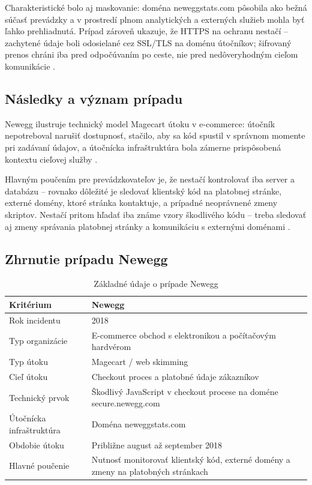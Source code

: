 Charakteristické bolo aj maskovanie: doména neweggstats.com pôsobila ako bežná súčasť prevádzky a v prostredí plnom analytických a externých služieb mohla byť ľahko prehliadnutá. Prípad zároveň ukazuje, že HTTPS na ochranu nestačí -- zachytené údaje boli odosielané cez SSL/TLS na doménu útočníkov; šifrovaný prenos chráni iba pred odpočúvaním po ceste, nie pred nedôveryhodným cieľom komunikácie \cite{owaspSRI,pciSsc2025PaymentPage,volexity2018Newegg}.

\subsection{Následky a význam prípadu}

Newegg ilustruje technický model Magecart útoku v e-commerce: útočník nepotreboval narušiť dostupnosť, stačilo, aby sa kód spustil v správnom momente pri zadávaní údajov, a útočnícka infraštruktúra bola zámerne prispôsobená kontextu cieľovej služby \cite{volexity2018Newegg,fortinet2019MagecartSkimmer}.

Hlavným poučením pre prevádzkovateľov je, že nestačí kontrolovať iba server a databázu -- rovnako dôležité je sledovať klientský kód na platobnej stránke, externé domény, ktoré stránka kontaktuje, a prípadné neoprávnené zmeny skriptov. Nestačí pritom hľadať iba známe vzory škodlivého kódu -- treba sledovať aj zmeny správania platobnej stránky a komunikáciu s externými doménami \cite{pciSsc2025PaymentPage}.

\subsection{Zhrnutie prípadu Newegg}

\begin{table}[htbp]
    \centering
    \caption{Základné údaje o prípade Newegg}
    \label{tab:newegg-summary}
    \begin{tabularx}{\textwidth}{@{}p{}X@{}}
        \toprule
        \textbf{Kritérium} & \textbf{Newegg} \\
        \midrule
        Rok incidentu & 2018 \\
        Typ organizácie & E-commerce obchod s elektronikou a počítačovým hardvérom \\
        Typ útoku & Magecart / web skimming \\
        Cieľ útoku & Checkout proces a platobné údaje zákazníkov \\
        Technický prvok & Škodlivý JavaScript v checkout procese na doméne \mbox{secure.newegg.com} \\
        Útočnícka infraštruktúra & Doména neweggstats.com \\
        Obdobie útoku & Približne august až september 2018 \\
        Hlavné poučenie & Nutnosť monitorovať klientský kód, externé domény a zmeny na platobných stránkach \\
        \bottomrule
    \end{tabularx}
\end{table}
